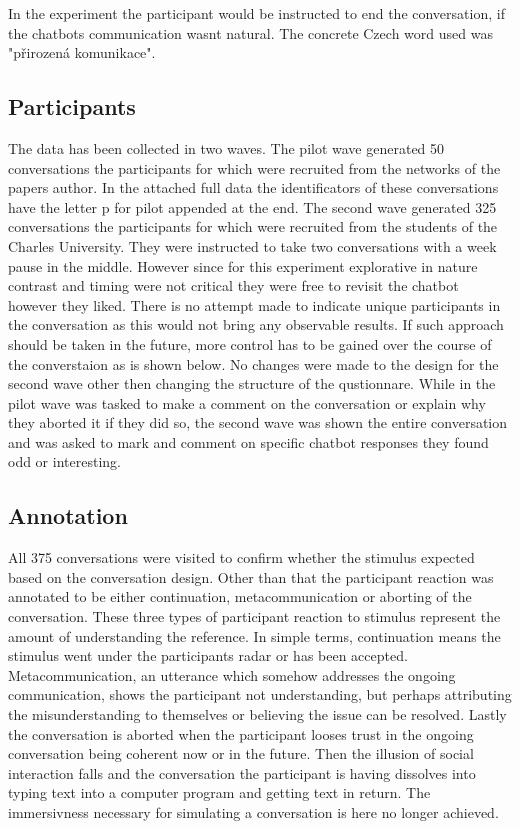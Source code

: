 In the experiment the participant would be instructed to end the conversation,
if the chatbots communication wasnt natural.
The concrete Czech word used was "přirozená komunikace".

\subsection{Participants}
The data has been collected in two waves.
The pilot wave generated 50 conversations
the participants for which were recruited from the networks of the papers author.
In the attached full data
the identificators of these conversations have
the letter p for pilot appended at the end.
The second wave generated 325 conversations
the participants for which were recruited from the students of the Charles University.
They were instructed to take two conversations with a week pause in the middle.
However since for this experiment explorative in nature contrast and timing were not critical
they were free to revisit the chatbot however they liked.
There is no attempt made to indicate unique participants in the conversation as
this would not bring any observable results.
If such approach should be taken in the future,
more control has to be gained over the course of the converstaion
as is shown below.
No changes were made to the design for the second wave other then changing the structure of the qustionnare.
While in the pilot wave was tasked to make a comment on the conversation or
explain why they aborted it if they did so,
the second wave was shown the entire conversation
and was asked to mark and comment on specific chatbot responses they found odd or interesting.


\subsection{Annotation}

All 375 conversations were visited to confirm whether
the stimulus expected based on the conversation design.
Other than that the participant reaction was annotated to be either
continuation, metacommunication or aborting of the conversation.
These three types of participant reaction to stimulus
represent the amount of understanding the reference.
In simple terms, continuation means
the stimulus went under the participants radar
or has been accepted.
Metacommunication, an utterance which somehow addresses the ongoing communication,
shows the participant not understanding,
but perhaps attributing the misunderstanding to themselves or
believing the issue can be resolved.
Lastly the conversation is aborted when the participant looses trust
in the ongoing conversation being coherent now or in the future.
Then the illusion of social interaction falls
and the conversation the participant is having dissolves into
typing text into a computer program and getting text in return.
The immersivness necessary for simulating a conversation is here no longer achieved.

